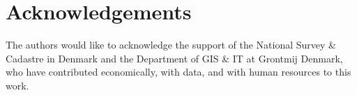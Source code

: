 \section{Acknowledgements}
The authors would like to acknowledge the support of the National Survey \& Cadastre in Denmark and the Department of GIS \& IT at Grontmij Denmark, who have contributed economically, with data, and with human resources to this work.